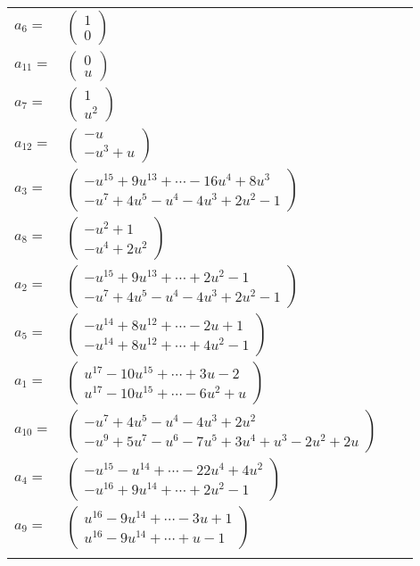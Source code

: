 \documentclass[1p]{elsarticle_modified}
\theoremstyle{definition}
\begin{document}
\begin{tabular}{m{7pt} m{180pt} m{7pt} m{180pt} }
\flushright $a_{6}=$&$\begin{pmatrix}1\\0\end{pmatrix}$ \\
\flushright $a_{11}=$&$\begin{pmatrix}0\\u\end{pmatrix}$ \\
\flushright $a_{7}=$&$\begin{pmatrix}1\\u^2\end{pmatrix}$ \\
\flushright $a_{12}=$&$\begin{pmatrix}- u\\- u^3+u\end{pmatrix}$ \\
\flushright $a_{3}=$&$\begin{pmatrix}- u^{15}+9 u^{13}+\cdots-16 u^4+8 u^3\\- u^7+4 u^5- u^4-4 u^3+2 u^2-1\end{pmatrix}$ \\
\flushright $a_{8}=$&$\begin{pmatrix}- u^2+1\\- u^4+2 u^2\end{pmatrix}$ \\
\flushright $a_{2}=$&$\begin{pmatrix}- u^{15}+9 u^{13}+\cdots+2 u^2-1\\- u^7+4 u^5- u^4-4 u^3+2 u^2-1\end{pmatrix}$ \\
\flushright $a_{5}=$&$\begin{pmatrix}- u^{14}+8 u^{12}+\cdots-2 u+1\\- u^{14}+8 u^{12}+\cdots+4 u^2-1\end{pmatrix}$ \\
\flushright $a_{1}=$&$\begin{pmatrix}u^{17}-10 u^{15}+\cdots+3 u-2\\u^{17}-10 u^{15}+\cdots-6 u^2+u\end{pmatrix}$ \\
\flushright $a_{10}=$&$\begin{pmatrix}- u^7+4 u^5- u^4-4 u^3+2 u^2\\- u^9+5 u^7- u^6-7 u^5+3 u^4+u^3-2 u^2+2 u\end{pmatrix}$ \\
\flushright $a_{4}=$&$\begin{pmatrix}- u^{15}- u^{14}+\cdots-22 u^4+4 u^2\\- u^{16}+9 u^{14}+\cdots+2 u^2-1\end{pmatrix}$ \\
\flushright $a_{9}=$&$\begin{pmatrix}u^{16}-9 u^{14}+\cdots-3 u+1\\u^{16}-9 u^{14}+\cdots+u-1\end{pmatrix}$\\&\end{tabular}
\end{document}
